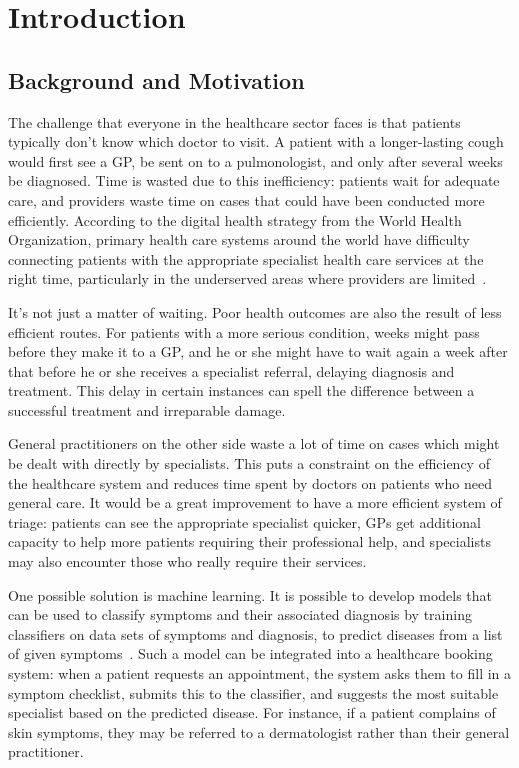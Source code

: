 \chapter{Introduction}
\label{ch:introduction}

\section{Background and Motivation}
\label{sec:background}

The challenge that everyone in the healthcare sector faces is that patients typically don't know which doctor to visit. A patient with a longer-lasting cough would first see a GP, be sent on to a pulmonologist, and only after several weeks be diagnosed. Time is wasted due to this inefficiency: patients wait for adequate care, and providers waste time on cases that could have been conducted more efficiently. According to the digital health strategy from the World Health Organization, primary health care systems around the world have difficulty connecting patients with the appropriate specialist health care services at the right time, particularly in the underserved areas where providers are limited~\citep{WHO2021}.

It's not just a matter of waiting. Poor health outcomes are also the result of less efficient routes. For patients with a more serious condition, weeks might pass before they make it to a GP, and he or she might have to wait again a week after that before he or she receives a specialist referral, delaying diagnosis and treatment. This delay in certain instances can spell the difference between a successful treatment and irreparable damage.

General practitioners on the other side waste a lot of time on cases which might be dealt with directly by specialists. This puts a constraint on the efficiency of the healthcare system and reduces time spent by doctors on patients who need general care. It would be a great improvement to have a more efficient system of triage: patients can see the appropriate specialist quicker, GPs get additional capacity to help more patients requiring their professional help, and specialists may also encounter those who really require their services.

One possible solution is machine learning. It is possible to develop models that can be used to classify symptoms and their associated diagnosis by training classifiers on data sets of symptoms and diagnosis, to predict diseases from a list of given symptoms~\citep{Rajpurkar2022}. Such a model can be integrated into a healthcare booking system: when a patient requests an appointment, the system asks them to fill in a symptom checklist, submits this to the classifier, and suggests the most suitable specialist based on the predicted disease. For instance, if a patient complains of skin symptoms, they may be referred to a dermatologist rather than their general practitioner.

